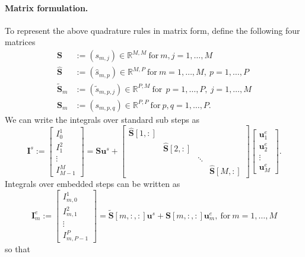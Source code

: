 \documentclass{article}
\newcommand{\ve}[1]{\mathbf{#1}}
\begin{document}
\paragraph{Matrix formulation.}
To represent the above quadrature rules in matrix form, define the following four matrices
\begin{align*}
	\ve{S} &:= \left( s_{m,j} \right) \in \mathbb{R}^{M,M} \ \text{for} \ m,j=1,\ldots,M \\ 
	\hat{\ve{S}} &:= \left( \hat{s}_{m,p} \right) \in \mathbb{R}^{M,P} \ \text{for} \ m=1,\ldots,M, \ p=1,\ldots,P \\
	\tilde{\ve{S}}_m &:= \left( \tilde{s}_{m,p,j} \right) \in \mathbb{R}^{P,M} \ \text{for} \ \ p=1,\ldots,P, \ j=1,\ldots,M \\
	\ve{S}_m &:= \left( s_{m,p,q} \right) \in \mathbb{R}^{P,P} \ \text{for} \ p,q=1,\ldots,P.
\end{align*}
We can write the integrals over standard sub steps as
\begin{equation}
	\ve{I}^s := 
	\begin{bmatrix}
		I_{0}^1 \\ I_1^2 \\ \vdots \\ I_{M-1}^{M}
	\end{bmatrix}
	=
	\ve{S} \ve{u}^s +
	\begin{bmatrix}
		\hat{\ve{S}}[1,:] & & \\ & \hat{\ve{S}}[2,:] \\ & & \ddots \\ & & & \hat{\ve{S}}[M,:] 
	\end{bmatrix}
	\begin{bmatrix}
		\ve{u}^e_1 \\ \ve{u}^e_2 \\ \vdots \\ \ve{u}^{e}_{M}
	\end{bmatrix}.
\end{equation}
Integrals over embedded steps can be written as
\begin{equation}
	\ve{I}^e_m :=
	\begin{bmatrix}
		I_{m,0}^{1} \\ I_{m,1}^{2} \\ \vdots \\ I_{m,P-1}^{P}
	\end{bmatrix}
	=
	\tilde{\ve{S}}[m,:,:] \ve{u}^s + \ve{S}[m,:,:] \ve{u}^e_m, \ \text{for} \ m=1,\ldots,M
\end{equation}
so that
\end{document}
